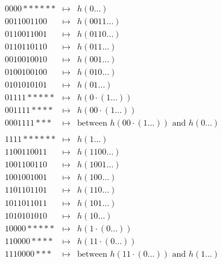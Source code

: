 \documentclass[a4paper]{article}
\newcommand{\any}{{*}}
\begin{document}
\[
 \begin{array}{rcl}
 0000\any\any\any\any\any\any & \mapsto & h(0\dots) \\
 0011001100 & \mapsto & h(0011\dots) \\
 0110011001 & \mapsto & h(0110\dots) \\
 0110110110 & \mapsto & h(011\dots) \\
 0010010010 & \mapsto & h(001\dots) \\
 0100100100 & \mapsto & h(010\dots) \\
 0101010101 & \mapsto & h(01\dots) \\

 01111\any\any\any\any\any & \mapsto & h(0 \cdot (1\dots)) \\
 001111\any\any\any\any & \mapsto & h(00 \cdot (1\dots)) \\
 0001111\any\any\any & \mapsto & \mbox{between } h(00 \cdot (1\dots))
\mbox{ and } h(0\dots) \\

 \end{array}
\]
\[
 \begin{array}{rcl}
 1111\any\any\any\any\any\any & \mapsto & h(1\dots) \\
 1100110011 & \mapsto & h(1100\dots) \\
 1001100110 & \mapsto & h(1001\dots) \\
 1001001001 & \mapsto & h(100\dots) \\
 1101101101 & \mapsto & h(110\dots) \\
 1011011011 & \mapsto & h(101\dots) \\
 1010101010 & \mapsto & h(10\dots) \\

 10000\any\any\any\any\any & \mapsto & h(1 \cdot (0\dots)) \\
 110000\any\any\any\any & \mapsto & h(11 \cdot (0\dots)) \\
 1110000\any\any\any & \mapsto & \mbox{between } h(11 \cdot (0\dots))
\mbox{ and } h(1\dots) \\
 \end{array}
\]
\end{document}
